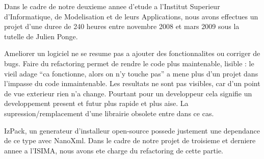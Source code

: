     Dans le cadre de notre deuxieme annee d'etude a l'Institut Superieur d'Informatique, de Modelisation et de leurs
Applications, nous avons effectues un projet d'une duree de 240 heures entre novembre 2008 et mars 2009 sous la
tutelle de Julien Ponge.

Ameliorer un logiciel ne se resume pas a ajouter des fonctionnalites ou corriger de bugs. Faire du refactoring permet de rendre le code plus maintenable, lisible : le vieil adage ``ca fonctionne, alors on n'y touche pas'' a mene plus d'un projet dans l'impasse du code inmaintenable. Les resultats ne sont pas visibles, car d'un point de vue exterieur rien n'a change. Pourtant pour un developpeur cela signifie un developpement present et futur plus rapide et plus aise. La supression/remplacement d'une librairie obsolete entre dans ce cas.

IzPack, un generateur d'installeur open-source possede justement une dependance de ce type avec NanoXml. Dans le cadre de notre projet de troisieme et derniere annee a l'ISIMA, nous avons ete charge du refactoring de cette partie.
